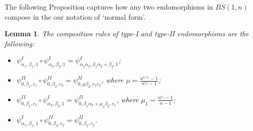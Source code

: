 \documentclass[a4paper]{amsart}
\newtheorem{lem}[thm]{Lemma}
\theoremstyle{definition}
\begin{document}
The following Proposition captures how any two endomorphisms in $BS(1,n)$ compose in the our notation of `normal form'.

\begin{lem}\label{lem: Composition}
The composition rules of type-I and type-II endomorphisms are the following:
%
\begin{itemize}
    \item[(i)] $\psi^{I}_{\alpha_1, \beta_1, 1} \circ \psi^{I}_{\alpha_2, \beta_2, 1} =\psi^{I}_{\alpha_1\alpha_2, \beta_1\alpha_2+\beta_2, 1}$;
    
    \item[(ii)] $\psi^{II}_{0,\beta_1, c_1} \circ \psi^{II}_{0,\beta_2, c_2} =\psi^{II}_{0, \mu\beta_2, c_1c_2}$, where $\mu = \frac{n^{c_1c_2}-1}{n^{c_2}-1}$;
    
    \item[(iii)] $\psi^{II}_{0,\beta_1, c_1} \circ \psi^{I}_{\alpha_2, \beta_2, 1} = \psi^{II}_{0, \beta_1\alpha_2 + \mu_1\beta_2, c_1}$, where $\mu_1 = \frac{n^{c_1} - 1}{n-1}$;
    
    \item[(iv)] $\psi^{I}_{\alpha_1, \beta_1, 1} \circ \psi^{II}_{0,\beta_2, c_2} = \psi^{II}_{0,\beta_2, c_2}$.
\end{itemize}
%    
\end{lem}
\end{document}
